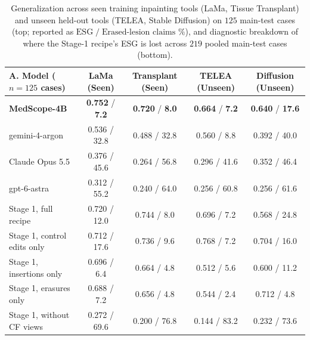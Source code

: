 \documentclass{article} %
\begin{document}
\begin{table}[h]
\caption{Generalization across seen training inpainting tools (LaMa, Tissue Transplant) and unseen held-out tools (TELEA, Stable Diffusion) on $125$ main-test cases (top; reported as $\text{ESG} \;/\; \text{Erased-lesion claims \%}$), and diagnostic breakdown of where the Stage-1 recipe's ESG is lost across $219$ pooled main-test cases (bottom).}
\label{tab:heldout_tools}
\begin{center}
\small
\begin{tabular}{lcccc}
\toprule
\textbf{A. Model ($n=125$ cases)} & \textbf{LaMa (Seen)} & \textbf{Transplant (Seen)} & \textbf{TELEA (Unseen)} & \textbf{Diffusion (Unseen)} \\
\midrule
\textbf{MedScope-4B} & \textbf{0.752} / \textbf{7.2} & \textbf{0.720} / \textbf{8.0} & \textbf{0.664} / \textbf{7.2} & \textbf{0.640} / \textbf{17.6} \\
gemini-4-argon & 0.536 / 32.8 & 0.488 / 32.8 & 0.560 / 8.8 & 0.392 / 40.0 \\
Claude Opus 5.5 & 0.376 / 45.6 & 0.264 / 56.8 & 0.296 / 41.6 & 0.352 / 46.4 \\
gpt-6-astra & 0.312 / 55.2 & 0.240 / 64.0 & 0.256 / 60.8 & 0.256 / 61.6 \\
\midrule
Stage 1, full recipe & 0.720 / 12.0 & 0.744 / 8.0 & 0.696 / 7.2 & 0.568 / 24.8 \\
Stage 1, control edits only & 0.712 / 17.6 & 0.736 / 9.6 & 0.768 / 7.2 & 0.704 / 16.0 \\
Stage 1, insertions only & 0.696 / 6.4 & 0.664 / 4.8 & 0.512 / 5.6 & 0.600 / 11.2 \\
Stage 1, erasures only & 0.688 / 7.2 & 0.656 / 4.8 & 0.544 / 2.4 & 0.712 / 4.8 \\
Stage 1, without CF views & 0.272 / 69.6 & 0.200 / 76.8 & 0.144 / 83.2 & 0.232 / 73.6 \\
\bottomrule
\end{tabular}

\vspace{0.2cm}
\end{center}
\end{table}
\end{document}

